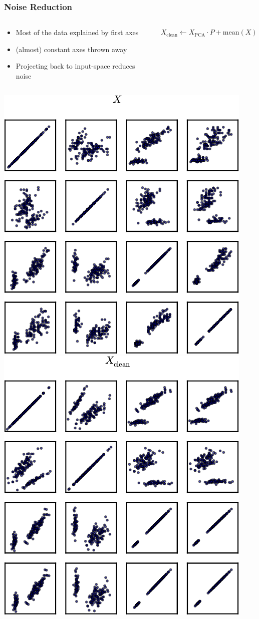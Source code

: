 \begin{frame}[fragile]
  \frametitle{Noise Reduction}
  \begin{columns}
      \begin{column}{.7\linewidth}
          \begin{itemize}
              \item Most of the data explained by first axes
              \item (almost) constant axes thrown away
              \item Projecting back to input-space reduces noise
          \end{itemize}
      \end{column}
      \begin{column}{.3\linewidth}
          \begin{align*}
              \!\!X_{\mathrm{clean}} \leftarrow X_{\mathrm{PCA}}\cdot P + 
              \mathrm{mean}(X)
          \end{align*}
      \end{column}
  \end{columns}
  \begin{center}
    \includegraphics[width=.40\linewidth]{pca-pics/iris-all-nocolor}\hfill%
    \includegraphics[width=.40\linewidth]{pca-pics/iris-bt-nocolor}
  \end{center}
\end{frame}


